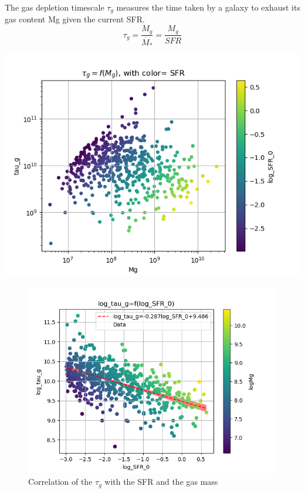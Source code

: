 \documentclass[a4paper,twocolumn]{article}
\begin{document}
The gas depletion timescale \(\tau_g\) measures the time taken by a galaxy to exhaust its gas content Mg given the current SFR\autocites{nageshSimulationsStarformingMainsequence2023}[][]{pflamm-altenburgFundamentalGasDepletion2009}.
\begin{equation}\label{eq:tau_g}
\tau_g=\frac{M_g}{\dot{M_*}}=\frac{M_g}{SFR}
\end{equation}

\begin{center}
\includegraphics[width=.9\linewidth]{./figs/tau_g-Mg-color_SFR.png}
\end{center}
\begin{figure}[!htpb]
\centering
\includegraphics[width=.9\linewidth]{./figs/log_SFR_0-log_tau_g-color_logMg.png}
\caption{\label{fig:Correlation of the $\tau_g$ with the SFR and the gas mass}Correlation of the \(\tau_g\) with the SFR and the gas mass}
\end{figure}
\end{document}
